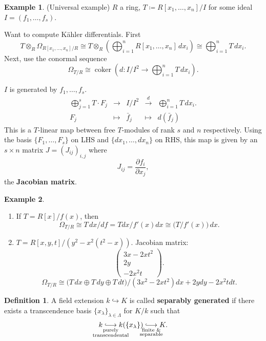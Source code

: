 \documentclass[12pt]{article}
\DeclareMathOperator{\coker}{coker}
\theoremstyle{definition}
\newtheorem*{definition}{Definition}
\newtheorem*{example}{Example}
\theoremstyle{remark}
\begin{document}
\begin{example}
(Universal example) $R$ a ring, $T\coloneqq R[x_1,\ldots,x_n]/I$ for some ideal $I=(f_1,\ldots,f_s)$.

Want to compute K\"{a}hler differentials. First
\[T\otimes_R\Omega_{R[x_1,\ldots,x_n]/R}\cong T\otimes_R\left(\bigoplus_{i=1}^nR[x_1,\ldots,x_n]\,dx_i\right)\cong\bigoplus_{i=1}^nT\,dx_i.\]
Next, use the conormal sequence
\[\Omega_{T/R}\cong\coker\left(d:I/I^2\rightarrow\bigoplus_{i=1}^nT\,dx_i\right).\]

$I$ is generated by $f_1,\ldots,f_s$.
\[
\begin{array}{rcccl}
\displaystyle{\bigoplus_{j=1}^sT\cdot F_j}&\longrightarrow&I/I^2&\overset{d}{\longrightarrow}&\displaystyle{\bigoplus_{i=1}^nT\,dx_i}.\\
F_j&\longmapsto&\bar{f}_j&\longmapsto&d(\bar{f}_j)
\end{array}
\]
This is a $T$-linear map between free $T$-modules of rank $s$ and $n$ respectively. Using the basis $\{F_1,\ldots,F_s\}$ on LHS and $\{dx_1,\ldots,dx_n\}$ on RHS, this map is given by an $s\times n$ matrix $J=(J_{ij})_{i,j}$ where
\[J_{ij}=\frac{\partial f_i}{\partial x_j},\]
the \textbf{Jacobian matrix}.
\end{example}

\begin{example}
\begin{enumerate}[label=\alph*)]
\item If $T=R[x]/f(x)$, then
\[\Omega_{T/R}\cong T\,dx/df=Tdx/f'(x)dx\cong\big(T/f'(x)\big)\,dx.\]
\item $T=R[x,y,t]/(y^2-x^2(t^2-x))$. Jacobian matrix:
\[\left(\begin{matrix}3x-2xt^2\\2y\\-2x^2t\end{matrix}\right).\]
\[\Omega_{T/R}\cong\big(T\,dx\oplus T\,dy\oplus T\,dt\big)/(3x^2-2xt^2)dx+2ydy-2x^2tdt.\]
\end{enumerate}
\end{example}

\begin{definition}
A field extension $k\hookrightarrow K$ is called \textbf{separably generated} if there exists a transcendence basis $\{x_{\lambda}\}_{\lambda\in\Lambda}$ for $K/k$ such that
\[k\underset{\mathclap{\substack{\text{purely}\\\text{transcendental}}}}{\lhook\joinrel\longrightarrow}k(\{x_{\lambda}\})\underset{\mathclap{\substack{\text{finite \&}\\\text{separable}}}}{\lhook\joinrel\longrightarrow}K.\]
\end{definition}
\end{document}
